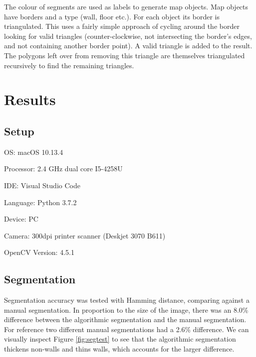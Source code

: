 \documentclass[11pt]{IEEEtran}
\begin{document}
The colour of segments are used as labels to generate map objects. Map objects have borders and a type (wall, floor etc.). For each object its border is triangulated. This uses a fairly simple approach of cycling around the border looking for valid triangles (counter-clockwise, not intersecting the border's edges, and not containing another border point). A valid triangle is added to the result. The polygons left over from removing this triangle are themselves triangulated recursively to find the remaining triangles. 


\section{Results}

\subsection{Setup}
OS: macOS 10.13.4

Processor: 2.4 GHz dual core I5-4258U

IDE: Visual Studio Code

Language: Python 3.7.2

Device: PC

Camera: 300dpi printer scanner (Deskjet 3070 B611)

OpenCV Version: 4.5.1

\subsection{Segmentation}

Segmentation accuracy was tested with Hamming distance, comparing against a manual segmentation. In proportion to the size of the image, there was an 8.0\% difference between the algorithmic segmentation and the manual segmentation. For reference two different manual segmentations had a 2.6\% difference. We can visually inspect Figure \ref{fig:segtest} to see that the algorithmic segmentation thickens non-walls and thins walls, which accounts for the larger difference.
\end{document}
